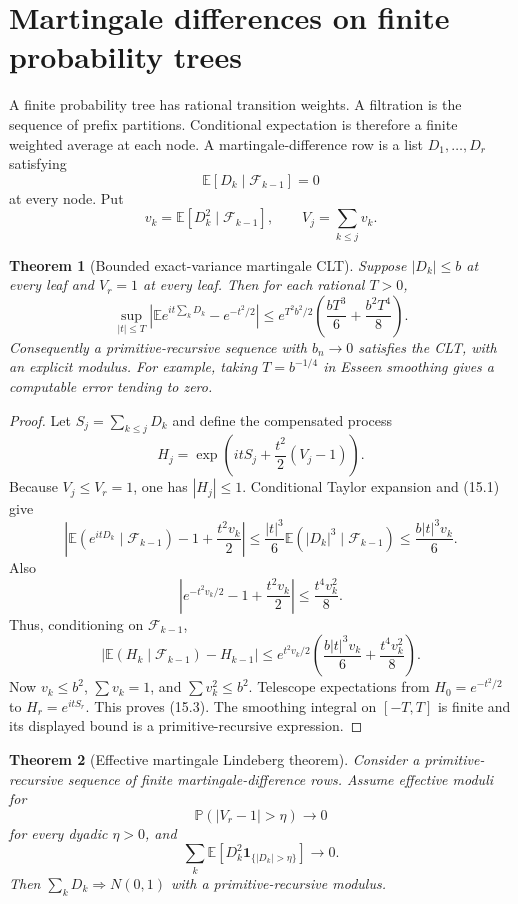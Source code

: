 \documentclass[11pt]{article}
\newtheorem{theorem}{Theorem}[section]
\newcommand{\E}{\mathbb E}
\newcommand{\Pp}{\mathbb P}
\newcommand{\ind}{\mathbf 1}
\begin{document}
\section{Martingale differences on finite probability trees}
\label{sec:martingale}

A finite probability tree has rational transition weights.  A filtration is
the sequence of prefix partitions.  Conditional expectation is therefore a
finite weighted average at each node.  A martingale-difference row is a list
\(D_1,\ldots,D_r\) satisfying
\[
 \E[D_k\mid\mathcal F_{k-1}]=0                       \tag{15.1}
\]
at every node.  Put
\[
 v_k=\E[D_k^2\mid\mathcal F_{k-1}],
 \qquad V_j=\sum_{k\le j}v_k.                         \tag{15.2}
\]

\begin{theorem}[Bounded exact-variance martingale CLT]
\label{thm:bounded-martingale}
Suppose \(|D_k|\le b\) at every leaf and \(V_r=1\) at every leaf.  Then for
each rational \(T>0\),
\[
 \sup_{|t|\le T}
 \left|\E e^{it\sum_kD_k}-e^{-t^2/2}\right|
 \le e^{T^2b^2/2}
      \left(\frac{bT^3}{6}+\frac{b^2T^4}{8}\right). \tag{15.3}
\]
Consequently a primitive-recursive sequence with \(b_n\to0\) satisfies the
CLT, with an explicit modulus.  For example, taking
\(T=b^{-1/4}\) in Esseen smoothing gives a computable error tending to zero.
\end{theorem}

\begin{proof}
Let \(S_j=\sum_{k\le j}D_k\) and define the compensated process
\[
 H_j=\exp\!\left(itS_j+\frac{t^2}{2}(V_j-1)\right).   \tag{15.4}
\]
Because \(V_j\le V_r=1\), one has \(|H_j|\le1\).  Conditional Taylor
expansion and (15.1) give
\[
 \left|\E(e^{itD_k}\mid\mathcal F_{k-1})
        -1+\frac{t^2v_k}{2}\right|
 \le\frac{|t|^3}{6}\E(|D_k|^3\mid\mathcal F_{k-1})
 \le\frac{b|t|^3v_k}{6}.                             \tag{15.5}
\]
Also
\[
 \left|e^{-t^2v_k/2}-1+\frac{t^2v_k}{2}\right|
 \le\frac{t^4v_k^2}{8}.                              \tag{15.6}
\]
Thus, conditioning on \(\mathcal F_{k-1}\),
\[
 |\E(H_k\mid\mathcal F_{k-1})-H_{k-1}|
 \le e^{t^2v_k/2}
  \left(\frac{b|t|^3v_k}{6}+\frac{t^4v_k^2}{8}\right).                \tag{15.7}
\]
Now \(v_k\le b^2\), \(\sum v_k=1\), and
\(\sum v_k^2\le b^2\).  Telescope expectations from
\(H_0=e^{-t^2/2}\) to \(H_r=e^{itS_r}\).  This proves (15.3).
The smoothing integral on \([-T,T]\) is finite and its displayed bound is a
primitive-recursive expression.
\end{proof}

\begin{theorem}[Effective martingale Lindeberg theorem]
\label{thm:martingale-general}
Consider a primitive-recursive sequence of finite martingale-difference rows.
Assume effective moduli for
\[
 \Pp(|V_r-1|>\eta)\longrightarrow0                   \tag{15.8}
\]
for every dyadic \(\eta>0\), and
\[
 \sum_k\E\!
  \left[D_k^2\ind_{\{|D_k|>\eta\}}\right]
 \longrightarrow0.                                   \tag{15.9}
\]
Then \(\sum_kD_k\Longrightarrow N(0,1)\) with a primitive-recursive
modulus.
\end{theorem}
\end{document}
